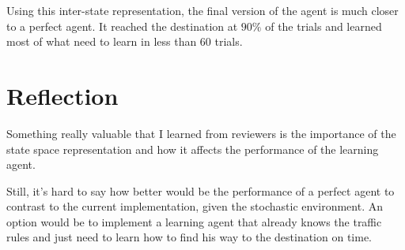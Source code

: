 \documentclass[a4paper]{article}
\begin{document}
Using this inter-state representation, the final version of the agent is much closer to a perfect agent. It reached the destination at $90\%$ of the trials and learned most of what need to learn in less than $60$ trials.


\section{Reflection}
\label{sec:reflection}
Something really valuable that I learned from reviewers is the importance of the state space representation and how it affects the performance of the learning agent.

Still, it's hard to say how better would be the performance of a perfect agent to contrast to the current implementation, given the stochastic environment. An option would be to implement a learning agent that already knows the traffic rules and just need to learn how to find his way to the destination on time.





\end{document}
